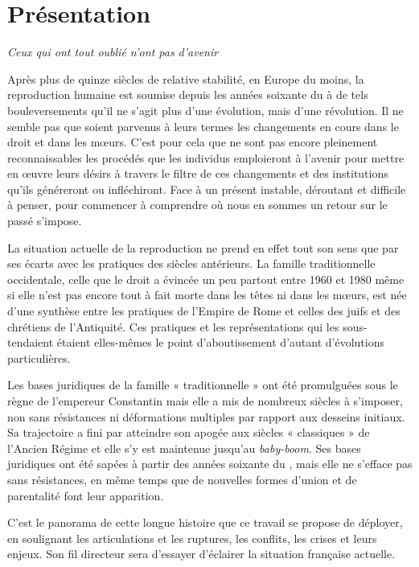 

\chapter{Présentation}

\emph{Ceux qui ont tout oublié n'ont pas d'avenir}





Après plus de quinze siècles de relative stabilité, en Europe du moins, la reproduction humaine
est soumise depuis les années soixante du  à de tels bouleversements
qu'il ne s'agit plus d'une évolution, mais d'une révolution. Il
ne semble pas que soient  parvenus à leurs termes les changements en
cours dans le droit et dans les mœurs. C'est pour cela que ne sont pas
encore pleinement reconnaissables les procédés que les individus emploieront
à l'avenir pour mettre en œuvre leurs désirs à travers le filtre
de ces changements et des institutions qu'ils généreront ou infléchiront.
Face à un présent instable, déroutant et difficile à penser, pour commencer à
comprendre où nous en sommes
 un retour sur le passé s'impose.

La situation actuelle de la reproduction ne prend en
effet tout son sens que par ses écarts avec les pratiques des siècles antérieurs.
La famille traditionnelle occidentale, celle que le droit a évincée un peu partout entre 1960 et
1980 même si elle n'est pas encore tout à fait morte dans les têtes ni dans les mœurs, est
née d'une synthèse entre les pratiques de l'Empire de Rome et celles des
juifs et des chrétiens de l'Antiquité. Ces pratiques et les représentations
qui les sous-tendaient étaient elles-mêmes le point d'aboutissement
d'autant d'évolutions particulières.

Les bases juridiques de la famille « traditionnelle » ont été promulguées sous le règne
de l'empereur Constantin mais elle a mis de nombreux
siècles à s'imposer, non sans résistances ni déformations multiples par
rapport aux desseins initiaux. Sa trajectoire a fini par atteindre son apogée aux
siècles « classiques » de l'Ancien Régime et elle s'y est maintenue jusqu'au
\emph{baby-boom}. Ses bases juridiques ont été sapées à partir des années soixante du , mais elle ne s'efface pas sans résistances, en même temps que de nouvelles formes d'union et de parentalité font leur apparition.

C'est le panorama de cette longue histoire que ce travail se propose de déployer, en soulignant les articulations et les ruptures, les
conflits, les crises et leurs enjeux. Son fil directeur sera d'essayer d'éclairer la situation française actuelle.

